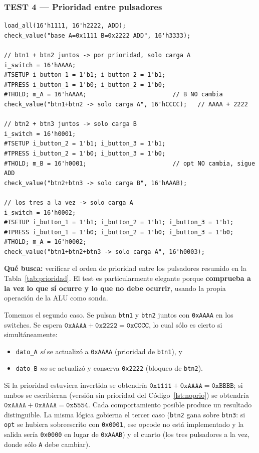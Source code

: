 \documentclass[12pt,a4paper]{article}
\begin{document}
\subsubsection{TEST 4 --- Prioridad entre pulsadores}

\begin{lstlisting}[caption={Verificación del codificador de prioridad.}]
load_all(16'h1111, 16'h2222, ADD);
check_value("base A=0x1111 B=0x2222 ADD", 16'h3333);

// btn1 + btn2 juntos -> por prioridad, solo carga A
i_switch = 16'hAAAA;
#TSETUP i_button_1 = 1'b1; i_button_2 = 1'b1;
#TPRESS i_button_1 = 1'b0; i_button_2 = 1'b0;
#THOLD; m_A = 16'hAAAA;                        // B NO cambia
check_value("btn1+btn2 -> solo carga A", 16'hCCCC);   // AAAA + 2222

// btn2 + btn3 juntos -> solo carga B
i_switch = 16'h0001;
#TSETUP i_button_2 = 1'b1; i_button_3 = 1'b1;
#TPRESS i_button_2 = 1'b0; i_button_3 = 1'b0;
#THOLD; m_B = 16'h0001;                        // opt NO cambia, sigue ADD
check_value("btn2+btn3 -> solo carga B", 16'hAAAB);

// los tres a la vez -> solo carga A
i_switch = 16'h0002;
#TSETUP i_button_1 = 1'b1; i_button_2 = 1'b1; i_button_3 = 1'b1;
#TPRESS i_button_1 = 1'b0; i_button_2 = 1'b0; i_button_3 = 1'b0;
#THOLD; m_A = 16'h0002;
check_value("btn1+btn2+btn3 -> solo carga A", 16'h0003);
\end{lstlisting}

\textbf{Qué busca:} verificar el orden de prioridad entre los pulsadores
resumido en la Tabla~\ref{tab:prioridad}. El test es
particularmente elegante porque \textbf{comprueba a la vez lo que sí ocurre y lo
que no debe ocurrir}, usando la propia operación de la ALU como sonda.

Tomemos el segundo caso. Se pulsan \texttt{btn1} y \texttt{btn2} juntos con
\texttt{0xAAAA} en los switches. Se espera $\texttt{0xAAAA} + \texttt{0x2222} =
\texttt{0xCCCC}$, lo cual sólo es cierto si simultáneamente:

\begin{itemize}[leftmargin=2em,itemsep=0.15em]
  \item \texttt{dato\_A} \emph{sí} se actualizó a \texttt{0xAAAA} (prioridad de
        \texttt{btn1}), y
  \item \texttt{dato\_B} \emph{no} se actualizó y conserva \texttt{0x2222}
        (bloqueo de \texttt{btn2}).
\end{itemize}

Si la prioridad estuviera invertida se obtendría $\texttt{0x1111} +
\texttt{0xAAAA} = \texttt{0xBBBB}$; si ambos se escribieran (versión sin
prioridad del Código~\ref{lst:noprio}) se obtendría $\texttt{0xAAAA} +
\texttt{0xAAAA} = \texttt{0x5554}$. Cada comportamiento posible produce un
resultado distinguible. La misma lógica gobierna el tercer caso (\texttt{btn2}
gana sobre \texttt{btn3}: si \texttt{opt} se hubiera sobreescrito con
\texttt{0x0001}, ese opcode no está implementado y la salida sería
\texttt{0x0000} en lugar de \texttt{0xAAAB}) y el cuarto (los tres pulsadores a
la vez, donde sólo \texttt{A} debe cambiar).
\end{document}
